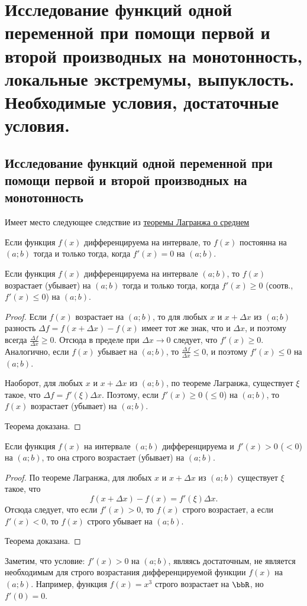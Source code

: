 \chapter{Исследование функций одной переменной при помощи первой и второй производных на монотонность, локальные экстремумы, выпуклость. Необходимые условия, достаточные условия.}

\section{Исследование функций одной переменной при помощи первой и второй производных на монотонность}

Имеет место следующее следствие из \hyperref[ch4t1]{теоремы Лагранжа о среднем}
\begin{thm}
Если функция $f(x)$ дифференцируема на интервале, то $f(x)$ постоянна на $(a;b)$ тогда и только тогда, когда $f'(x)=0$ на $(a;b)$.
\end{thm}
 
\begin{thm} Если функция $f(x)$ дифференцируема на интервале $(a;b)$, то $f(x)$ возрастает (убывает) на $(a;b)$ тогда и только тогда, когда $f'(x)\ge 0$ (соотв., $f'(x)\le 0$) на $(a;b)$.
\end{thm}
\begin{proof} Если $f(x)$ возрастает на $(a;b)$, то для любых $x$ и $x+\Delta x$ из $(a;b)$ разность $\Delta f = f(x+\Delta x) - f(x)$ имеет тот же знак, что и $\Delta x$, и поэтому всегда $\frac{\Delta f}{\Delta x} \ge 0$. Отсюда в пределе при $\Delta x \to 0$ следует, что $f'(x) \ge 0$. Аналогично, если $f(x)$ убывает на $(a;b)$, то $\frac{\Delta f}{\Delta x} \le 0$, и поэтому $f'(x) \le 0$ на $(a;b)$.

Наоборот, для любых $x$ и $x + \Delta x$ из $(a;b)$, по теореме Лагранжа, существует $\xi$ такое, что $\Delta f = f'(\xi)\Delta x$. Поэтому, если $f'(x) \ge 0$ ($\le 0$) на $(a;b)$, то $f(x)$ возрастает (убывает) на $(a;b)$.

Теорема доказана.
\end{proof}

\begin{thm}  Если функция $f(x)$ на интервале $(a;b)$ дифференцируема и $f'(x) > 0$ ($< 0$) на $(a;b)$, то она строго возрастает (убывает) на $(a;b)$.
\end{thm}
\begin{proof}
По теореме Лагранжа, для любых $x$ и $x + \Delta x$ из $(a; b)$ существует $\xi$ такое, что
$$
f(x+\Delta x)-f(x)=f'(\xi)\Delta x.
$$
Отсюда следует, что если $f'(x) > 0$, то $f(x)$ строго возрастает, а если $f'(x) < 0$, то $f(x)$ строго убывает на $(a;b)$. 

Теорема доказана.
\end{proof}
Заметим, что условие: $f'(x) > 0$ на $(a;b)$, являясь достаточным, не является необходимым для строго возрастания дифференцируемой функции $f(x)$ на $(a;b)$. Например, функция $f(x) = x^3$ строго возрастает на $\bbR$, но $f'(0) = 0$.

